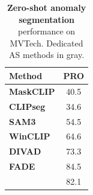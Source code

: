 \begin{table}
\centering
\footnotesize
\setlength{\tabcolsep}{4pt}
\vspace{-13mm}
\caption{\textbf{Zero-shot anomaly segmentation} performance on MVTech. Dedicated AS methods in gray.}
\label{tab:anomaly_detection_small}
\begin{tabular}{lc}
\toprule
Method   & \multicolumn{1}{l}{PRO} \\
\midrule
\textbf{MaskCLIP} \cite{zhou2022_maskclip} & 40.5 \\
\textbf{CLIPseg} \cite{lueddecke22_clipseg}  & 34.6 \\
\textbf{SAM3} \cite{carion2025_sam3}     & 54.5 \\
\addlinespace
\color{gray}\textbf{WinCLIP} \cite{WinCLIP_Jeong23CVPR}  & \color{gray}64.6 \\
\color{gray}\textbf{DIVAD} \cite{hicsonmez2026training}   & \color{gray}73.3 \\
\color{gray}\textbf{FADE}  \cite{li2024_fade}   & \color{gray}84.5 \\
\addlinespace
\rowcolor{\methodcolor}\textbf{\model{}}   & 82.1 \\
\bottomrule
\end{tabular}
\vspace{-5mm}
\end{table}

